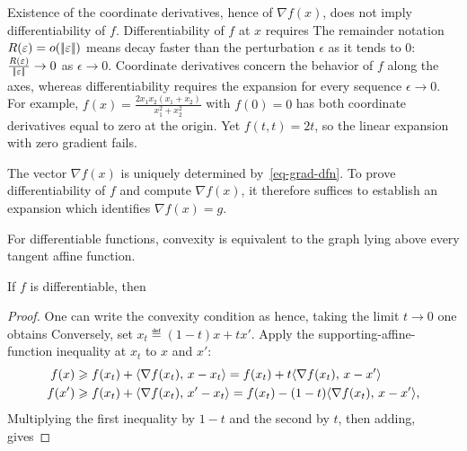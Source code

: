 Existence of the coordinate derivatives, hence of $\nabla f(x)$, does not imply differentiability of $f$. Differentiability of $f$ at $x$ requires
%
The remainder notation $R(\varepsilon) = o(|\!| \varepsilon |\!|)$ means decay faster than the perturbation $\epsilon$ as it tends to $0$: $\frac{R(\varepsilon)}{|\!| \varepsilon |\!|} \rightarrow 0$ as $\epsilon \rightarrow 0$. Coordinate derivatives concern the behavior of $f$ along the axes, whereas differentiability requires the expansion for every sequence $\epsilon\rightarrow 0$.
%
For example, $f(x)=\frac{2 x_1 x_2 (x_1+x_2)}{x_1^2+x_2^2}$ with $f(0)=0$ has both coordinate derivatives equal to zero at the origin. Yet $f(t,t)=2t$, so the linear expansion with zero gradient fails.

The vector $\nabla f(x)$ is uniquely determined by~\eqref{eq-grad-dfn}. To prove differentiability of $f$ and compute $\nabla f(x)$, it therefore suffices to establish an expansion
which identifies $\nabla f(x)=g$.

For differentiable functions, convexity is equivalent to the graph lying above every tangent affine function.

\begin{prop}\label{prop-above-tgt}
	If $f$ is differentiable, then
\end{prop}
\begin{proof}
	One can write the convexity condition as
	hence, taking the limit $t \rightarrow 0$ one obtains
	Conversely, set $x_t\eqdef(1-t)x+tx'$. Apply the supporting-affine-function inequality at $x_t$ to $x$ and $x'$:
	\begin{align*}
		f(x)  & \geqslant f(x_t) + \langle \nabla f(x_t),\,x-x_t\rangle =f(x_t)+t\langle \nabla f(x_t),\,x-x'\rangle \\
		f(x') & \geqslant f(x_t) + \langle \nabla f(x_t),\,x'-x_t\rangle =f(x_t)-(1-t)\langle \nabla f(x_t),\,x-x'\rangle,
	\end{align*}
	Multiplying the first inequality by $1-t$ and the second by $t$, then adding, gives
\end{proof}


